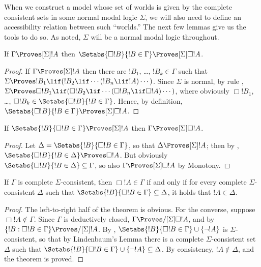 \documentclass[../../../include/open-logic-section]{subfiles}
\begin{document}

  
When we construct a model whose set of worlds is given by the complete
consistent sets in some normal modal logic $\Sigma$, we will also need
to define an accessibility relation between such ``worlds.'' The next
few lemmas give us the tools to do so. As noted, $\Sigma$ will be a
normal modal logic throughout.

\begin{lem}
  If $\Gamma \Proves[\Sigma] !A$ then $\Setabs{\Box !B}{!B \in
  \Gamma} \Proves[\Sigma] \Box !A$.
\end{lem}

\begin{proof}
  If $\Gamma \Proves[\Sigma] !A$ then there are $!B_1$, \dots, $!B_k
  \in \Gamma$ such that $\Sigma \Proves !B_1 \lif (!B_2 \lif \cdots
  (!B_n \lif !A)\cdots)$. Since $\Sigma$ is normal, by rule \RK{},
  $\Sigma \Proves \Box!B_1 \lif (\Box!B_2 \lif \cdots (\Box!B_n \lif
  \Box!A)\cdots)$, where obviously $\Box!B_1$, \dots, $\Box!B_k \in
  \Setabs{\Box!B}{!B \in\Gamma}$. Hence, by definition, $\Setabs{\Box
      !B}{!B \in \Gamma} \Proves[\Sigma] \Box !A$.
\end{proof}

\begin{lem}
  If $\Setabs{!B}{\Box !B \in \Gamma} \Proves[\Sigma] !A$ then
  $\Gamma \Proves[\Sigma] \Box!A$.
\end{lem}

\begin{proof}
  Let $\Delta = \Setabs{!B}{\Box !B \in \Gamma}$, so that $\Delta
  \Proves[\Sigma] !A$; then by ,
  $\Setabs{\Box !B}{!B \in \Delta} \Proves \Box!A$. But obviously
  $\Setabs{\Box !B}{!B \in \Delta} \subseteq \Gamma$, so also $\Gamma
  \Proves[\Sigma] \Box!A$ by Monotony.
\end{proof}

\begin{thm}
  If $\Gamma$ is complete $\Sigma$-consistent, then $\Box !A \in
  \Gamma$ if and only if for every complete $\Sigma$-consistent
  $\Delta$ such that $\Setabs{!B}{\Box !B \in \Gamma} \subseteq
  \Delta$, it holds that $!A \in \Delta$.
\end{thm}

\begin{proof}
  The left-to-right half of the theorem is obvious. For the converse,
  suppose $\Box!A \notin \Gamma$. Since $\Gamma$ is deductively
  closed, $\Gamma \Proves/[\Sigma] \Box !A$, and by
   $\{ !B : \Box!B \in \Gamma\}
  \Proves/[\Sigma] !A$. By
  ,
  $\Setabs{!B}{\Box!B \in \Gamma} \cup \{ \lnot!A \}$ is
  $\Sigma$-consistent, so that by Lindenbaum's Lemma there is a
  complete $\Sigma$-consistent set~$\Delta$ such that
  $\Setabs{!B}{\Box!B \in \Gamma} \cup \{ \lnot!A \} \subseteq
  \Delta$. By consistency, $!A \notin \Delta$, and the theorem is
  proved.
\end{proof}
\end{document}
